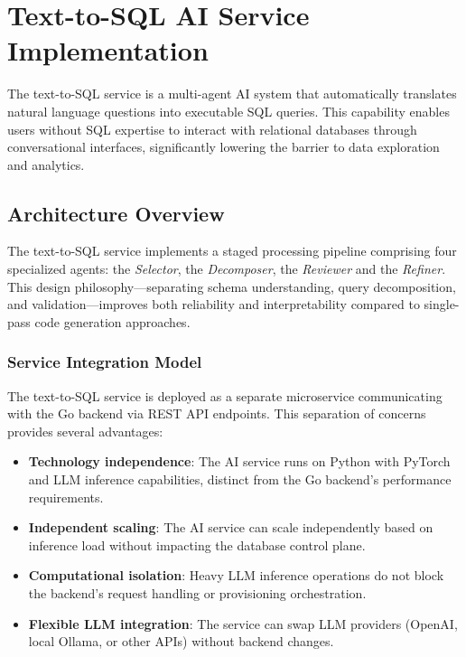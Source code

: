 \section{Text-to-SQL AI Service Implementation}

The text-to-SQL service is a multi-agent AI system that automatically translates natural language questions into executable SQL queries. This capability enables users without SQL expertise to interact with relational databases through conversational interfaces, significantly lowering the barrier to data exploration and analytics.

\subsection{Architecture Overview}

The text-to-SQL service implements a staged processing pipeline comprising four specialized agents: the
\textit{Selector}, the \textit{Decomposer}, the \textit{Reviewer} and the \textit{Refiner}. This design philosophy---separating schema
understanding, query decomposition, and validation---improves both reliability and interpretability compared to
single-pass code generation approaches.

\subsubsection{Service Integration Model}

The text-to-SQL service is deployed as a separate microservice communicating with the Go backend via REST API endpoints. This separation of concerns provides several advantages:

\begin{itemize}
    \item \textbf{Technology independence}: The AI service runs on Python with PyTorch and LLM inference capabilities, distinct from the Go backend's performance requirements.
    \item \textbf{Independent scaling}: The AI service can scale independently based on inference load without impacting the database control plane.
    \item \textbf{Computational isolation}: Heavy LLM inference operations do not block the backend's request handling or provisioning orchestration.
    \item \textbf{Flexible LLM integration}: The service can swap LLM providers (OpenAI, local Ollama, or other APIs) without backend changes.
\end{itemize}

